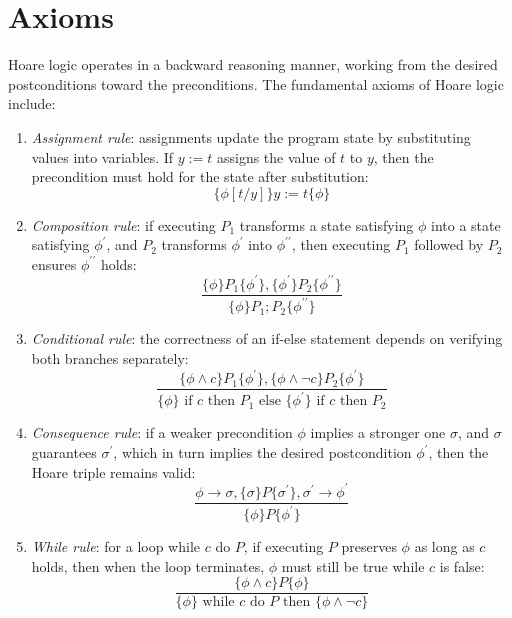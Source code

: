 \section{Axioms}

Hoare logic operates in a backward reasoning manner, working from the desired postconditions toward the preconditions. 
The fundamental axioms of Hoare logic include:
\begin{enumerate}
    \item \textit{Assignment rule}: assignments update the program state by substituting values into variables. 
        If $y:=t$ assigns the value of $t$ to $y$, then the precondition must hold for the state after substitution:
        \[\{\phi[t/y]\} y:=t \{\phi\}\]
    \item \textit{Composition rule}: if executing $P_1$ transforms a state satisfying $\phi$ into a state satisfying $\phi^\prime$, and $P_2$ transforms $\phi^\prime$ into $\phi^{\prime\prime}$, then executing $P_1$ followed by $P_2$ ensures $\phi^{\prime\prime}$ holds:
        \[\dfrac{\{\phi\} P_1 \{\phi^\prime\},\{\phi^\prime\} P_2 \{\phi^{\prime\prime}\}}{\{\phi\} P_1;P_2 \{\phi^{\prime\prime}\}}\]
    \item \textit{Conditional rule}: the correctness of an if-else statement depends on verifying both branches separately:
         \[\dfrac{\{\phi \land c\} P_1 \{\phi^\prime\}, \{\phi\land\lnot c\} P_2 \{\phi^\prime\}}{\{\phi\} \text{ if }c\text{ then }P_1\text{ else }\{\phi^\prime\}\text{ if }c\text{ then }P_2}\]
    \item \textit{Consequence rule}: if a weaker precondition $\phi$ implies a stronger one $\sigma$, and $\sigma$ guarantees $\sigma^\prime$, which in turn implies the desired postcondition $\phi^\prime$, then the Hoare triple remains valid:
        \[\dfrac{\phi\rightarrow \sigma, \{\sigma\} P \{\sigma^\prime\}, \sigma^\prime\rightarrow \phi^\prime}{\{\phi\} P \{\phi^\prime\}}\]
    \item \textit{While rule}: for a loop while $c$ do $P$, if executing $P$ preserves $\phi$ as long as $c$ holds, then when the loop terminates, $\phi$ must still be true while $c$ is false:
        \[\dfrac{\{\phi \land c\} P \{\phi\}}{\{\phi\}\text{ while }c\text{ do }P\text{ then }\{\phi \land¬c\}}\]
\end{enumerate}

